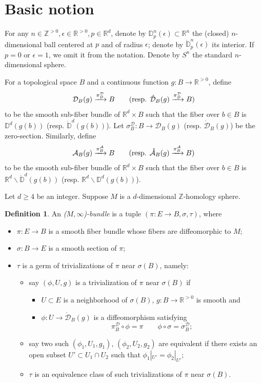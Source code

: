 \documentclass[11pt]{article}
\theoremstyle{definition}
\newtheorem{dfn}[thm]{Definition}
\theoremstyle{remark}
\def\mr#1{{\mathring{#1}}}
\def\Z{\mathbb{Z}}
\def\R{\mathbb{R}}
\def\D{\mathbb{D}}
\def\cA{\mathcal{A}}
\def\cD{\mathcal{D}}
\def\tn#1{\textnormal{#1}}
\begin{document}
\setlength{\parskip}{\baselineskip}
\setlength{\parindent}{0cm}

\section{Basic notion}
\label{basic_sec}

For any $n\in\Z^{>0},\epsilon\in\R^{>0},p\in\R^d$, denote by $\D^n_p(\epsilon)\subset\R^n$ the (closed) $n$-dimensional ball centered at $p$ and of radius $\epsilon$; denote by $\mr\D^n_p(\epsilon)$ its interior. 
If $p=0$ or $\epsilon=1$, we omit it from the notation. 
Denote by $S^{n}$ the standard $n$-dimensional sphere. 

For a topological space $B$ and a continuous function $g: B\to \R^{>0}$, define
$$\cD_B(g)\xrightarrow{\pi^\cD_{B}} B\qquad
(\tn{resp. } \mr\cD_B(g)\xrightarrow{\pi^\cD_B} B)$$
to be the smooth sub-fiber bundle of $\R^d\times B$ such that the fiber over $b\in B$ is $\D^d(g(b))$ (resp. $\mr\D^d(g(b))$). 
Let $\sigma_B^\cD:B\to \cD_B(g)$ (resp. $\mr\cD_B(g)$) be the zero-section. 
Similarly, define
$$\cA_B(g)\xrightarrow{\pi^\cA_B} B\qquad
(\tn{resp. } \mr\cA_B(g)\xrightarrow{\pi^\cA_B} B)$$
to be the smooth sub-fiber bundle of $\R^d\times B$ such that the fiber over $b\in B$ is $\R^d\backslash\mr\D^d(g(b))$ (resp. $\R^d\backslash\D^d(g(b))$). 

Let $d\geq4$ be an integer. Suppose $M$ is a $d$-dimensional $\Z$-homology sphere. 

\begin{dfn}
An {\it ($M,\infty$)-bundle} is a tuple $(\pi:E\to B,\sigma,\tau)$, where
\begin{itemize}
\item $\pi:E\to B$ is a smooth fiber bundle whose fibers are diffeomorphic to $M$;
\item $\sigma:B\to E$ is a smooth section of $\pi$; 
\item $\tau$ is a germ of trivializations of $\pi$ near $\sigma(B)$, namely: 
\begin{itemize}
\item say $(\phi, U,g)$ is a trivialization of $\pi$ near $\sigma(B)$ if 
\begin{itemize}
\item $U\subset E$ is a neighborhood of $\sigma(B)$, $g:B\to\R^{>0}$ is smooth and 
\item $\phi: U\to \mr{\cD}_B(g)$ is a diffeomorphism satisfying 
$$\pi^\cD_{B}\circ\phi=\pi\qquad \phi\circ\sigma=\sigma^\cD_B;$$
\end{itemize}
\item say two such $(\phi_1,U_1,g_1)$, $(\phi_2,U_2,g_2)$ are equivalent if there exists an open subset $U'\subset U_1\cap U_2$ such that $\phi_1|_{U'}=\phi_2|_{U'}$; 
\item $\tau$ is an equivalence class of such trivializations of $\pi$ near $\sigma(B)$. 
\end{itemize}
\end{itemize}
\end{dfn}
\end{document}
